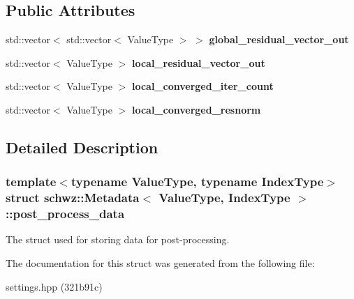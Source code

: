 \subsection*{Public Attributes}
\begin{DoxyCompactItemize}
\item 
\mbox{\label{structschwz_1_1Metadata_1_1post__process__data_a3cd4dc39548794213196924e925947e4}} 
std\+::vector$<$ std\+::vector$<$ Value\+Type $>$ $>$ {\bfseries global\+\_\+residual\+\_\+vector\+\_\+out}
\item 
\mbox{\label{structschwz_1_1Metadata_1_1post__process__data_ac508dd9baaf55fe3eefaac84a081ea07}} 
std\+::vector$<$ Value\+Type $>$ {\bfseries local\+\_\+residual\+\_\+vector\+\_\+out}
\item 
\mbox{\label{structschwz_1_1Metadata_1_1post__process__data_ae089ea8c22e004373eb6f53c2db01383}} 
std\+::vector$<$ Value\+Type $>$ {\bfseries local\+\_\+converged\+\_\+iter\+\_\+count}
\item 
\mbox{\label{structschwz_1_1Metadata_1_1post__process__data_af03f16caf28849a9b1946c52d7d628fb}} 
std\+::vector$<$ Value\+Type $>$ {\bfseries local\+\_\+converged\+\_\+resnorm}
\end{DoxyCompactItemize}


\subsection{Detailed Description}
\subsubsection*{template$<$typename Value\+Type, typename Index\+Type$>$\newline
struct schwz\+::\+Metadata$<$ Value\+Type, Index\+Type $>$\+::post\+\_\+process\+\_\+data}

The struct used for storing data for post-\/processing. 

The documentation for this struct was generated from the following file\+:\begin{DoxyCompactItemize}
\item 
settings.\+hpp (321b91c)\end{DoxyCompactItemize}
